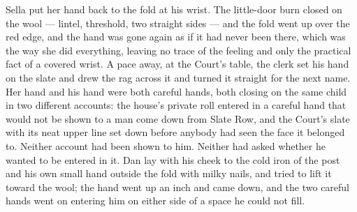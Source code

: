 Sella put her hand back to the fold at his wrist. The little-door burn closed on the wool — lintel, threshold, two straight sides — and the fold went up over the red edge, and the hand was gone again as if it had never been there, which was the way she did everything, leaving no trace of the feeling and only the practical fact of a covered wrist. A pace away, at the Court's table, the clerk set his hand on the slate and drew the rag across it and turned it straight for the next name. Her hand and his hand were both careful hands, both closing on the same child in two different accounts: the house's private roll entered in a careful hand that would not be shown to a man come down from Slate Row, and the Court's slate with its neat upper line set down before anybody had seen the face it belonged to. Neither account had been shown to him. Neither had asked whether he wanted to be entered in it. Dan lay with his cheek to the cold iron of the post and his own small hand outside the fold with milky nails, and tried to lift it toward the wool; the hand went up an inch and came down, and the two careful hands went on entering him on either side of a space he could not fill.

